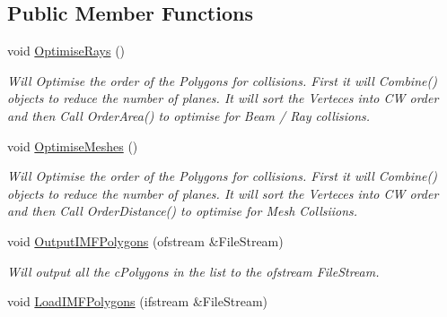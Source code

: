 \subsection*{Public Member Functions}
\begin{DoxyCompactItemize}
\item 
\hypertarget{classc_polygon_list_a91cd1f95d714e3c2fbdac38d3cfc76df}{
void \hyperlink{classc_polygon_list_a91cd1f95d714e3c2fbdac38d3cfc76df}{OptimiseRays} ()}
\label{classc_polygon_list_a91cd1f95d714e3c2fbdac38d3cfc76df}

\begin{DoxyCompactList}\small\item\em Will Optimise the order of the Polygons for collisions. First it will Combine() objects to reduce the number of planes. It will sort the Verteces into CW order and then Call OrderArea() to optimise for Beam / Ray collisions. \end{DoxyCompactList}\item 
\hypertarget{classc_polygon_list_a3c6b265a4d2071846aad8a2cdb284152}{
void \hyperlink{classc_polygon_list_a3c6b265a4d2071846aad8a2cdb284152}{OptimiseMeshes} ()}
\label{classc_polygon_list_a3c6b265a4d2071846aad8a2cdb284152}

\begin{DoxyCompactList}\small\item\em Will Optimise the order of the Polygons for collisions. First it will Combine() objects to reduce the number of planes. It will sort the Verteces into CW order and then Call OrderDistance() to optimise for Mesh Collsiions. \end{DoxyCompactList}\item 
\hypertarget{classc_polygon_list_a58e083905fc9056c63509c070e1b19a1}{
void \hyperlink{classc_polygon_list_a58e083905fc9056c63509c070e1b19a1}{OutputIMFPolygons} (ofstream \&FileStream)}
\label{classc_polygon_list_a58e083905fc9056c63509c070e1b19a1}

\begin{DoxyCompactList}\small\item\em Will output all the cPolygons in the list to the ofstream FileStream. \end{DoxyCompactList}\item 
\hypertarget{classc_polygon_list_a4d02fe5180fbc38003c67fa39d0f4c8e}{
void \hyperlink{classc_polygon_list_a4d02fe5180fbc38003c67fa39d0f4c8e}{LoadIMFPolygons} (ifstream \&FileStream)}
\label{classc_polygon_list_a4d02fe5180fbc38003c67fa39d0f4c8e}


\end{DoxyCompactItemize}
